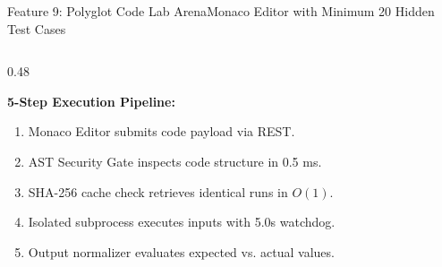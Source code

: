 \documentclass[aspectratio=169,10pt]{beamer}
\begin{document}
\begin{frame}[t]{Feature 9: Polyglot Code Lab Arena}{Monaco Editor with Minimum 20 Hidden Test Cases}
\begin{columns}[t]
\begin{column}{0.48\textwidth}
\begin{itemize}
      \end{itemize}
      \vspace{0.1cm}
      {\fontsize{8.0}{10.0}\selectfont\textbf{\textcolor{KoinexaRed}{5-Step Execution Pipeline:}}}
      \begin{enumerate}\setlength{\itemsep}{1.0pt}
        \item {\fontsize{7.5}{9.2}\selectfont Monaco Editor submits code payload via REST.}
        \item {\fontsize{7.5}{9.2}\selectfont AST Security Gate inspects code structure in 0.5 ms.}
        \item {\fontsize{7.5}{9.2}\selectfont SHA-256 cache check retrieves identical runs in $O(1)$.}
        \item {\fontsize{7.5}{9.2}\selectfont Isolated subprocess executes inputs with 5.0s watchdog.}
        \item {\fontsize{7.5}{9.2}\selectfont Output normalizer evaluates expected vs. actual values.}
      \end{enumerate}
    \end{column}
  \end{columns}
\end{frame}
\end{document}
